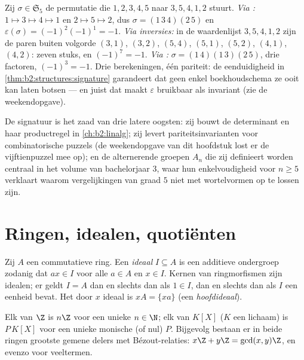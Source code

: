 \begin{example}\label{ex:b2:structures:threeroads}
Zij $\sigma \in \mathfrak{S}_5$ de permutatie die $1, 2, 3, 4, 5$
naar $3, 5, 4, 1, 2$ stuurt. \emph{Via :} $1 \mapsto 3
\mapsto 4 \mapsto 1$ en $2 \mapsto 5 \mapsto 2$, dus $\sigma =
(1\,3\,4)(2\,5)$ en $\varepsilon(\sigma) = (-1)^{2}(-1)^{1} =
-1$. \emph{Via inversies:} in de waardenlijst $3, 5, 4, 1, 2$
zijn de paren buiten volgorde $(3,1)$, $(3,2)$, $(5,4)$, $(5,1)$,
$(5,2)$, $(4,1)$, $(4,2)$: zeven stuks, en $(-1)^7 = -1$.
\emph{Via :} $\sigma = (1\,4)(1\,3)(2\,5)$, drie
factoren, $(-1)^3 = -1$. Drie berekeningen, één pariteit: de
eenduidigheid in \cref{thm:b2:structures:signature} garandeert
dat geen enkel boekhoudschema ze ooit kan laten botsen --- en
juist dat maakt $\varepsilon$ bruikbaar als invariant (zie de
weekendopgave).
\end{example}

\begin{remark}
De signatuur is het zaad van drie latere oogsten: zij bouwt de
determinant en haar productregel in \cref{ch:b2:linalg}; zij
levert pariteitsinvarianten voor combinatorische puzzels (de
weekendopgave van dit hoofdstuk lost er de vijftienpuzzel mee op);
en de alternerende groepen $A_n$ die zij definieert worden
centraal in het volume van bachelorjaar 3, waar hun enkelvoudigheid
voor $n \geq 5$ verklaart waarom vergelijkingen van graad $5$ niet
met wortelvormen op te lossen zijn.
\end{remark}

\section{Ringen, idealen, quotiënten}

\begin{definition}[Ideaal]\label{def:b2:structures:ideal}
Zij $A$ een commutatieve ring. Een \emph{ideaal} $I
\subseteq A$ is een additieve ondergroep zodanig dat $a x \in I$
voor alle $a \in A$ en $x \in I$. Kernen van ringmorfismen zijn
idealen; er geldt $I = A$ dan en slechts dan als $1 \in I$, dan en
slechts dan als $I$ een eenheid bevat. Het door $x$
\emph{} ideaal is $xA = \{xa\}$ (een
\emph{hoofdideaal}).
\end{definition}

\begin{theorem}\label{thm:b2:structures:principal}
Elk  van $\Z$ is $n\Z$ voor een unieke $n \in \N$; elk
 van $K[X]$ ($K$ een lichaam) is $P\,K[X]$ voor een unieke
monische (of nul) $P$. Bijgevolg bestaan er in beide ringen
grootste gemene delers met Bézout-relaties: $x\Z + y\Z =
\gcd(x,y)\Z$, en evenzo voor veeltermen.
\end{theorem}

